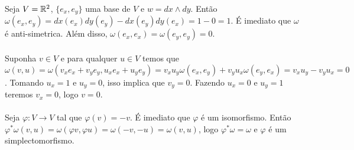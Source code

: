 \documentclass{beamer}
\begin{document}
	\begin{frame}
		
		
		
		\begin{exemplo}
			Seja $V = \mathbb{R}^{2}$, $\{e_{x}, e_{y}\}$ uma base de $V$ e $w=dx \wedge dy$. Então $\omega(e_{x}, e_{y}) =dx(e_{x}) dy(e_{y}) - dx(e_{y}) dy(e_{x}) = 1-0= 1$. É imediato que $\omega$ é anti-simetrica. Além disso, $\omega(e_{x}, e_{x}) = \omega(e_{y}, e_{y}) = 0$. 
			\\~\\
			Suponha $v \in V$ e para qualquer $u \in V$ temos que $\omega(v, u) = \omega(v_{x}e_{x}+v_{y}e_{y}, u_{x}e_{x}+u_{y}e_{y}) = v_{x}u_{y}\omega(e_{x}, e_{y}) +v_{y}u_{x}\omega(e_{y}, e_{x}) = v_{x}u_{y} -v_{y}u_{x} = 0$. Tomando $u_{x} = 1$ e $u_{y} = 0$, isso implica que $v_{y} = 0$. Fazendo $u_{x} = 0$ e $u_{y} = 1$ teremos $v_{x} = 0$, logo $v=0$. 
			\\~\\
			Seja $\varphi:V \to V$ tal que $\varphi(v) = -v$. É imediato que $\varphi$ é um isomorfismo. Então $\varphi^{*}\omega(v, u) = \omega(\varphi v, \varphi u)=\omega(-v, -u)=\omega(v, u)$, logo $\varphi^{*}\omega = \omega$ e $\varphi$ é um simplectomorfismo.		
		\end{exemplo}
	\end{frame}
	
\end{document}

